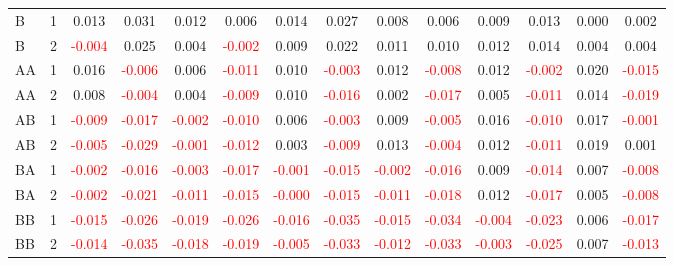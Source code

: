 \begin{table}[!htb]
{\begin{tabular}{llcccccccccccc}
B & 1 & 0.013 & 0.031 & 0.012 & 0.006 & 0.014 & 0.027 & 0.008 & 0.006 & 0.009 & 0.013 & 0.000 & 0.002\\
B & 2 & \textcolor{red}{-0.004} & 0.025 & 0.004 & \textcolor{red}{-0.002} & 0.009 & 0.022 & 0.011 & 0.010 & 0.012 & 0.014 & 0.004 & 0.004\\
AA & 1 & 0.016 & \textcolor{red}{-0.006} & 0.006 & \textcolor{red}{-0.011} & 0.010 & \textcolor{red}{-0.003} & 0.012 & \textcolor{red}{-0.008} & 0.012 & \textcolor{red}{-0.002} & 0.020 & \textcolor{red}{-0.015}\\
AA & 2 & 0.008 & \textcolor{red}{-0.004} & 0.004 & \textcolor{red}{-0.009} & 0.010 & \textcolor{red}{-0.016} & 0.002 & \textcolor{red}{-0.017} & 0.005 & \textcolor{red}{-0.011} & 0.014 & \textcolor{red}{-0.019}\\
AB & 1 & \textcolor{red}{-0.009} & \textcolor{red}{-0.017} & \textcolor{red}{-0.002} & \textcolor{red}{-0.010} & 0.006 & \textcolor{red}{-0.003} & 0.009 & \textcolor{red}{-0.005} & 0.016 & \textcolor{red}{-0.010} & 0.017 & \textcolor{red}{-0.001}\\
AB & 2 & \textcolor{red}{-0.005} & \textcolor{red}{-0.029} & \textcolor{red}{-0.001} & \textcolor{red}{-0.012} & 0.003 & \textcolor{red}{-0.009} & 0.013 & \textcolor{red}{-0.004} & 0.012 & \textcolor{red}{-0.011} & 0.019 & 0.001\\
BA & 1 & \textcolor{red}{-0.002} & \textcolor{red}{-0.016} & \textcolor{red}{-0.003} & \textcolor{red}{-0.017} & \textcolor{red}{-0.001} & \textcolor{red}{-0.015} & \textcolor{red}{-0.002} & \textcolor{red}{-0.016} & 0.009 & \textcolor{red}{-0.014} & 0.007 & \textcolor{red}{-0.008}\\
BA & 2 & \textcolor{red}{-0.002} & \textcolor{red}{-0.021} & \textcolor{red}{-0.011} & \textcolor{red}{-0.015} & \textcolor{red}{-0.000} & \textcolor{red}{-0.015} & \textcolor{red}{-0.011} & \textcolor{red}{-0.018} & 0.012 & \textcolor{red}{-0.017} & 0.005 & \textcolor{red}{-0.008}\\
BB & 1 & \textcolor{red}{-0.015} & \textcolor{red}{-0.026} & \textcolor{red}{-0.019} & \textcolor{red}{-0.026} & \textcolor{red}{-0.016} & \textcolor{red}{-0.035} & \textcolor{red}{-0.015} & \textcolor{red}{-0.034} & \textcolor{red}{-0.004} & \textcolor{red}{-0.023} & 0.006 & \textcolor{red}{-0.017}\\
BB & 2 & \textcolor{red}{-0.014} & \textcolor{red}{-0.035} & \textcolor{red}{-0.018} & \textcolor{red}{-0.019} & \textcolor{red}{-0.005} & \textcolor{red}{-0.033} & \textcolor{red}{-0.012} & \textcolor{red}{-0.033} & \textcolor{red}{-0.003} & \textcolor{red}{-0.025} & 0.007 & \textcolor{red}{-0.013}\\

\end{tabular}}
\end{table}
